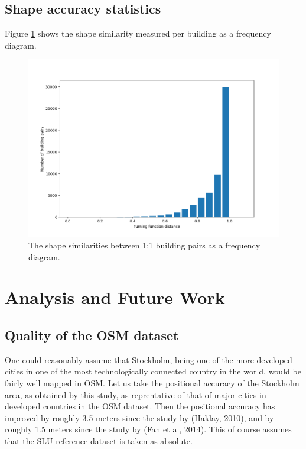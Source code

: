 \documentclass[a4paper]{article}
\begin{document}
\subsection{Shape accuracy statistics}

Figure \ref{fig:bar-plot-similarity} shows the shape similarity measured per building as a frequency diagram.

\begin{figure}[H]
    \centering
    \includegraphics[width=\textwidth,height=0.5\textheight,keepaspectratio]{img_turning_function_plot}
    \caption{The shape similarities between 1:1 building pairs as a frequency diagram.}
    \label{fig:bar-plot-similarity}
\end{figure}

\section{Analysis and Future Work}

\subsection{Quality of the OSM dataset}

One could reasonably assume that Stockholm, being one of the more developed cities in one of the most technologically connected country in the world, would be fairly well mapped in OSM.
Let us take the positional accuracy of the Stockholm area, as obtained by this study, as reprentative of that of major cities in developed countries in the OSM dataset.
Then the positional accuracy has improved by roughly 3.5 meters since the study by (Haklay, 2010), and by roughly 1.5 meters since the study by (Fan et al, 2014).
This of course assumes that the SLU reference dataset is taken as absolute.
\end{document}

